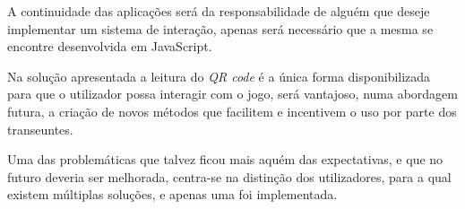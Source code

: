 A continuidade das aplicações será da responsabilidade de alguém que deseje implementar um sistema de interação, apenas será necessário que a mesma se encontre desenvolvida em JavaScript.

Na solução apresentada a leitura do \textit{QR code} é a única forma disponibilizada para que o utilizador possa interagir com o jogo, será vantajoso, numa abordagem futura, a criação de novos métodos que facilitem e incentivem o uso por parte dos transeuntes.

Uma das problemáticas que talvez ficou mais aquém das expectativas, e que no futuro deveria ser melhorada, centra-se na distinção dos utilizadores, para a qual existem múltiplas soluções, e apenas uma foi implementada.

